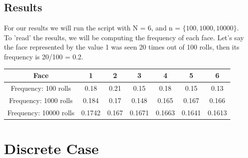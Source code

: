 \documentclass[a4paper]{article}
\begin{document}
\subsection*{Results}
For our results we will run the script with N = 6, and n = $\{ 100, 1000, 10000\}$.\\
To 'read' the results, we will be computing the frequency of each face. Let's say the face represented by the value 1 was seen 20 times out of 100 rolls, then its frequency is 20/100 = 0.2.
\begin{center}


\begin{table}[H]
\begin{tabular}{|c|c|c|c|c|c|c|}
\hline
Face                   & 1      & 2     & 3      & 4      & 5      & 6      \\ \hline
Frequency: 100 rolls   & 0.18   & 0.21  & 0.15   & 0.18   & 0.15   & 0.13   \\ \hline
Frequency: 1000 rolls  & 0.184  & 0.17  & 0.148  & 0.165  & 0.167  & 0.166  \\ \hline
Frequency: 10000 rolls & 0.1742 & 0.167 & 0.1671 & 0.1663 & 0.1641 & 0.1613 \\ \hline
\end{tabular}
\end{table}
\end{center}






\section*{Discrete Case}
\end{document}
